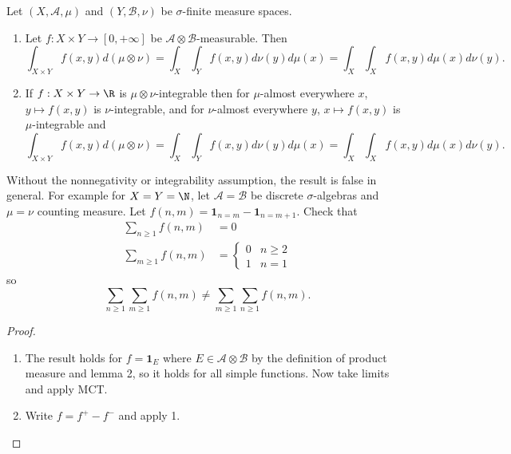 \documentclass[a4paper]{article}
\begin{document}
\begin{theorem}
  Let \((X, \mathcal A, \mu)\) and \((Y, \mathcal B, \nu)\) be \(\sigma\)-finite measure spaces.
  \begin{enumerate}
  \item Let \(f: X \times Y \to [0, +\infty]\) be \(\mathcal A \otimes \mathcal B\)-measurable. Then
    \[
      \int_{X \times Y} f(x, y) d(\mu \otimes \nu)
      = \int_X \int_Y f(x, y) d\nu(y) d\mu(x)
      = \int_X \int_X f(x, y) d\mu(x) d\nu(y).
    \]
  \item If \(f: X \times Y \to \R\) is \(\mu \otimes \nu\)-integrable then for \(\mu\)-almost everywhere \(x\), \(y \mapsto f(x, y)\) is \(\nu\)-integrable, and for \(\nu\)-almost everywhere \(y\), \(x \mapsto f(x, y)\) is \(\mu\)-integrable and
    \[
      \int_{X \times Y} f(x, y) d(\mu \otimes \nu)
      = \int_X \int_Y f(x, y) d\nu(y) d\mu(x)
      = \int_X \int_X f(x, y) d\mu(x) d\nu(y).
    \] 
  \end{enumerate}
\end{theorem}

Without the nonnegativity or integrability assumption, the result is false in general. For example for \(X = Y = \N\), let \(\mathcal A = \mathcal B\) be discrete \(\sigma\)-algebras and \(\mu = \nu\) counting measure. Let \(f(n, m) = \mathbf 1_{n = m} - \mathbf 1_{n = m + 1}\). Check that
\begin{align*}
  \sum_{n \geq 1} f(n, m) &= 0 \\
  \sum_{m \geq 1} f(n, m) &=
                            \begin{cases}
                              0 & n \geq 2 \\
                              1 & n = 1
                            \end{cases}
\end{align*}
so
\[
  \sum_{n \geq 1} \sum_{m \geq 1} f(n, m) \neq \sum_{m \geq 1} \sum_{n \geq 1} f(n, m).
\]

\begin{proof}\leavevmode
  \begin{enumerate}
  \item The result holds for \(f = \mathbf 1_E\) where \(E \in \mathcal A \otimes \mathcal B\) by the definition of product measure and lemma 2, so it holds for all simple functions. Now take limits and apply MCT.
  \item Write \(f = f^+ - f^-\) and apply 1.
  \end{enumerate}
\end{proof}
\end{document}
